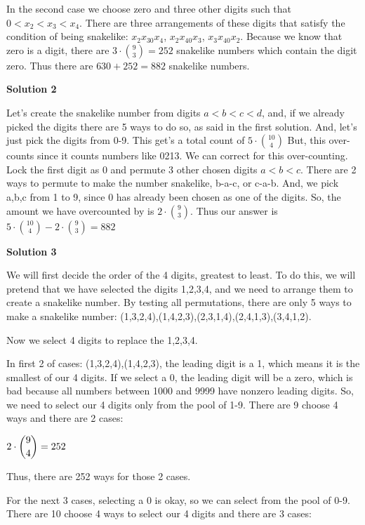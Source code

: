 \begin{enumerate}
 In the second case we choose zero and three other digits such that $0<x_2<x_3<x_4$. There are three arrangements of these digits that satisfy the condition of being snakelike: $x_2x_30x_4$, $x_2x_40x_3$, $x_3x_40x_2$. Because we know that zero is a digit, there are $3\cdot{9\choose 3}=252$ snakelike numbers which contain the digit zero. Thus there are $630+252=\boxed{882}$ snakelike numbers.

 



\textbf{Solution 2}

Let's create the snakelike number from digits $a < b < c < d$, and, if we already picked the digits there are 5 ways to do so, as said in the first solution. And, let's just pick the digits from 0-9. This get's a total count of $5\cdot{10 \choose 4}$ But, this over-counts since it counts numbers like 0213. We can correct for this over-counting. Lock the first digit as 0 and permute 3 other chosen digits $a < b < c$. There are 2 ways to permute to make the number snakelike, b-a-c, or c-a-b. And, we pick a,b,c from 1 to 9, since 0 has already been chosen as one of the digits. So, the amount we have overcounted by is $2\cdot{9 \choose 3}$. Thus our answer is $5\cdot{10 \choose 4} - 2\cdot{9 \choose 3} = \boxed{882}$




\textbf{Solution 3}

We will first decide the order of the 4 digits, greatest to least. To do this, we will pretend that we have selected the digits 1,2,3,4, and we need to arrange them to create a snakelike number. By testing all permutations, there are only 5 ways to make a snakelike number: (1,3,2,4),(1,4,2,3),(2,3,1,4),(2,4,1,3),(3,4,1,2). 

 Now we select 4 digits to replace the 1,2,3,4. 

 In first 2 of cases: (1,3,2,4),(1,4,2,3), the leading digit is a 1, which means it is the smallest of our 4 digits. If we select a 0, the leading digit will be a zero, which is bad because all numbers between 1000 and 9999 have nonzero leading digits. So, we need to select our 4 digits only from the pool of 1-9. There are 9 choose 4 ways and there are 2 cases:

 $2 \cdot \dbinom{9}{4} = 252$

 Thus, there are 252 ways for those 2 cases. 

 For the next 3 cases, selecting a 0 is okay, so we can select from the pool of 0-9. There are 10 choose 4 ways to select our 4 digits and there are 3 cases:


\end{enumerate}
